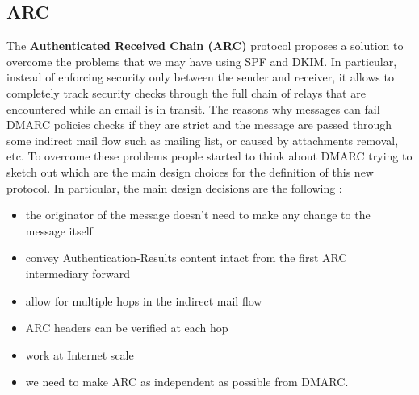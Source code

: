 \subsection{ARC}
The \textbf{Authenticated Received Chain (ARC)} protocol proposes a solution to overcome the problems that we may have using SPF and DKIM. In particular, instead of enforcing security only between the sender and receiver, it allows to completely track security checks through the full chain of relays that are encountered while an email is in transit. The reasons why messages can fail DMARC policies checks if they are strict and the message are passed through some indirect mail flow such as mailing list, or caused by attachments removal, etc. To overcome these problems people started to think about DMARC trying to sketch out which are the main design choices for the definition of this new protocol. In particular, the main design decisions are the following :
\begin{itemize}
\item the originator of the message doesn't need to make any change to the message itself
\item convey Authentication-Results content intact from the first ARC intermediary forward
\item allow for multiple hops in the indirect mail flow
\item ARC headers can be verified at each hop
\item work at Internet scale
\item we need to make ARC as independent as possible from DMARC.
\end{itemize}
